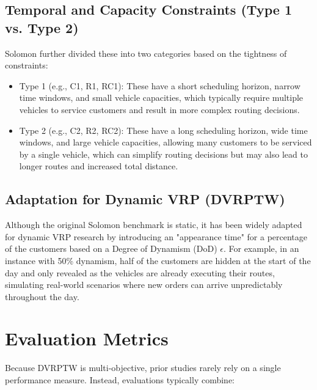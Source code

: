 \subsection{Temporal and Capacity Constraints (Type 1 vs. Type 2)}
Solomon further divided these into two categories based on the tightness of
constraints:
\begin{itemize}
	\item Type 1 (e.g., C1, R1, RC1): These have a short scheduling horizon, narrow time windows, and small vehicle capacities, which typically require multiple vehicles to service customers and result in more complex routing decisions.
	\item Type 2 (e.g., C2, R2, RC2): These have a long scheduling horizon, wide time windows, and large vehicle capacities, allowing many customers to be serviced by a single vehicle, which can simplify routing decisions but may also lead to longer routes and increased total distance.
\end{itemize}

\subsection{Adaptation for Dynamic VRP (DVRPTW)}
Although the original Solomon benchmark is static, it has been widely adapted
for dynamic VRP research by introducing an "appearance time" for a percentage of
the customers based on a Degree of Dynamism (DoD) $\epsilon$. For example, in an
instance with 50\% dynamism, half of the customers are hidden at the start of
the day and only revealed as the vehicles are already executing their routes,
simulating real-world scenarios where new orders can arrive unpredictably
throughout the day.

\section{Evaluation Metrics}
Because DVRPTW is multi-objective, prior studies rarely rely on a single
performance measure. Instead, evaluations typically combine:

